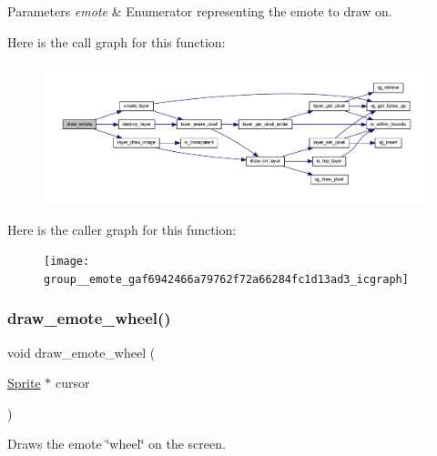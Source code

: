 \begin{DoxyParams}{Parameters}
{\em emote} & Enumerator representing the emote to draw on. \\
\hline
\end{DoxyParams}
Here is the call graph for this function\+:\nopagebreak
\begin{figure}[H]
\begin{center}
\leavevmode
\includegraphics[width=350pt]{group__emote_gaf6942466a79762f72a66284fc1d13ad3_cgraph}
\end{center}
\end{figure}
Here is the caller graph for this function\+:\nopagebreak
\begin{figure}[H]
\begin{center}
\leavevmode
\texttt{[image: group\_\_emote\_gaf6942466a79762f72a66284fc1d13ad3\_icgraph]}
\end{center}
\end{figure}
\mbox{\label{group__emote_gac2165e24eab22afc199808350c2ef84a}} 
\subsubsection{\texorpdfstring{draw\+\_\+emote\+\_\+wheel()}{draw\_emote\_wheel()}}
{\footnotesize\ttfamily void draw\+\_\+emote\+\_\+wheel (\begin{DoxyParamCaption}\item[{\mbox{\hyperlink{struct_sprite}{Sprite}} $\ast$}]{cursor }\end{DoxyParamCaption})}



Draws the emote \char`\"{}wheel\char`\"{} on the screen. 


